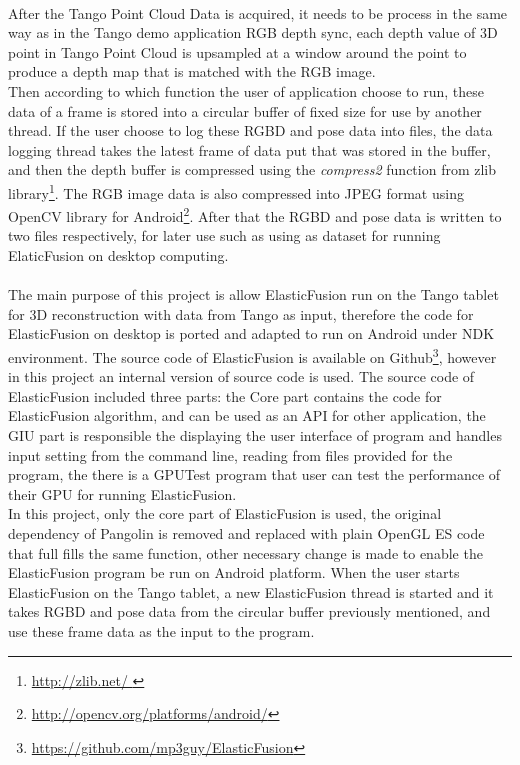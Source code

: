 \documentclass[12pt,twoside]{article}
\begin{document}
\\
After the Tango Point Cloud Data is acquired, it needs to be process in the same way as in the Tango demo application RGB depth sync, each depth value of 3D point in Tango Point Cloud is upsampled at a window around the point to produce a depth map that is matched with the RGB image.\\
Then according to which function the user of application choose to run, these data of a frame is stored into a circular buffer of fixed size for use by another thread. If the user choose to log these RGBD and pose data into files, the data logging thread takes the latest frame of data put that was stored in the buffer, and then the depth buffer is compressed using the \textit{compress2} function from zlib library\footnote{\url{http://zlib.net/
}}. The RGB image data is also compressed into JPEG format using OpenCV library for Android\footnote{\url{http://opencv.org/platforms/android/}}. After that the RGBD and pose data is written to two files respectively, for later use such as using as dataset for running ElaticFusion on desktop computing.\\
\\
The main purpose of this project is allow ElasticFusion run on the Tango tablet for 3D reconstruction with data from Tango as input, therefore the code for ElasticFusion on desktop is ported and adapted to run on Android under NDK environment. The source code of ElasticFusion is available on Github\footnote{\url{https://github.com/mp3guy/ElasticFusion}}, however in this project an internal version of source code is used. The source code of ElasticFusion included three parts: the Core part contains the code for ElasticFusion algorithm, and can be used as an API for other application, the GIU part is responsible the displaying the user interface of program and handles input setting from the command line, reading from files provided for the program, the there is a GPUTest program that user can test the performance of their GPU for running ElasticFusion.\\
In this project, only the core part of ElasticFusion is used, the original dependency of Pangolin is removed and replaced with plain OpenGL ES code that full fills the same function, other necessary change is made to enable the ElasticFusion program be run on Android platform. When the user starts ElasticFusion on the Tango tablet, a new ElasticFusion thread is started and it takes RGBD and pose data from the circular buffer previously mentioned, and use these frame data as the input to the program.\\
\end{document}
